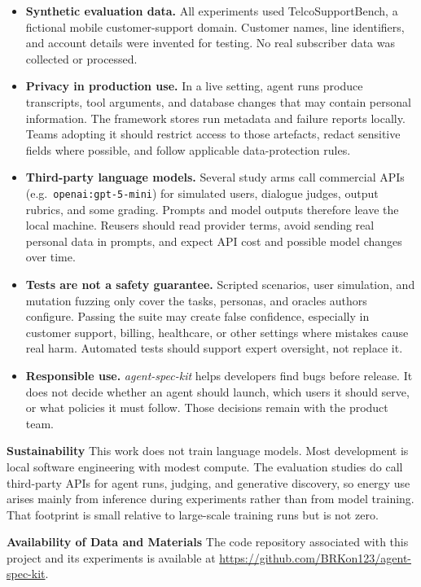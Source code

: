 \begin{itemize}
    \item \textbf{Synthetic evaluation data.} All experiments used TelcoSupportBench, a fictional mobile customer-support domain. Customer names, line identifiers, and account details were invented for testing. No real subscriber data was collected or processed.

    \item \textbf{Privacy in production use.} In a live setting, agent runs produce transcripts, tool arguments, and database changes that may contain personal information. The framework stores run metadata and failure reports locally. Teams adopting it should restrict access to those artefacts, redact sensitive fields where possible, and follow applicable data-protection rules.

    \item \textbf{Third-party language models.} Several study arms call commercial APIs (e.g.\ \texttt{openai:gpt-5-mini}) for simulated users, dialogue judges, output rubrics, and some grading. Prompts and model outputs therefore leave the local machine. Reusers should read provider terms, avoid sending real personal data in prompts, and expect API cost and possible model changes over time.

    \item \textbf{Tests are not a safety guarantee.} Scripted scenarios, user simulation, and mutation fuzzing only cover the tasks, personas, and oracles authors configure. Passing the suite may create false confidence, especially in customer support, billing, healthcare, or other settings where mistakes cause real harm. Automated tests should support expert oversight, not replace it.

    \item \textbf{Responsible use.} \emph{agent-spec-kit} helps developers find bugs before release. It does not decide whether an agent should launch, which users it should serve, or what policies it must follow. Those decisions remain with the product team.
\end{itemize}

\medskip
\noindent\textbf{Sustainability}
This work does not train language models. Most development is local software engineering with modest compute. The evaluation studies do call third-party APIs for agent runs, judging, and generative discovery, so energy use arises mainly from inference during experiments rather than from model training. That footprint is small relative to large-scale training runs but is not zero.

\medskip
\noindent\textbf{Availability of Data and Materials}
The code repository associated with this project and its experiments is available at \url{https://github.com/BRKon123/agent-spec-kit}.
